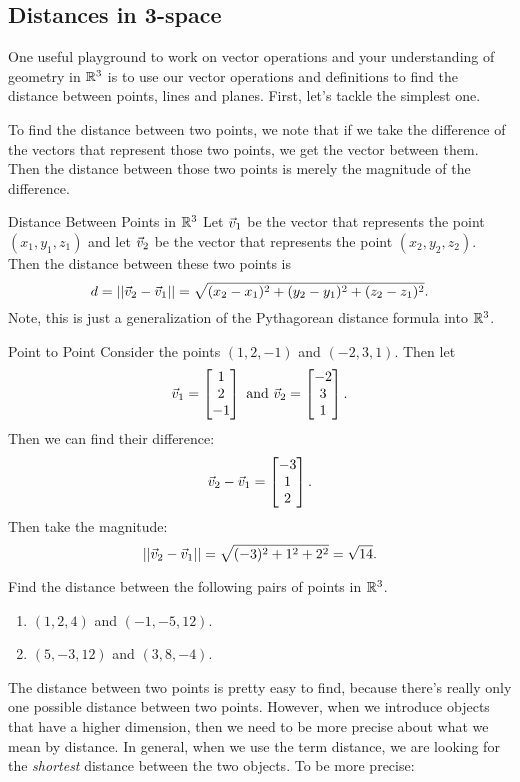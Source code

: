 \subsection{Distances in 3-space}
One useful playground to work on vector operations and your understanding of geometry in $\mathbb{R}^3$ is to use our vector operations and definitions to find the distance between points, lines and planes. First, let's tackle the simplest one.

To find the distance between two points, we note that if we take the difference of the vectors that represent those two points, we get the vector between them. Then the distance between those two points is merely the magnitude of the difference.

\begin{definition}{Distance Between Points in $\mathbb{R}^3$}
Let $\vec{v}_1$ be the vector that represents the point $(x_1,y_1,z_1)$ and let $\vec{v}_2$ be the vector that represents the point $(x_2,y_2,z_2)$. Then the distance between these two points is $$d=||\vec{v}_2-\vec{v}_1||=\sqrt{(x_2-x_1)^2+(y_2-y_1)^2+(z_2-z_1)^2}. $$
Note, this is just a generalization of the Pythagorean distance formula into $\mathbb{R}^3$.
\end{definition}

\begin{example}{Point to Point}
Consider the points $(1,2,-1)$ and $(-2,3,1)$. Then let
$$\vec{v}_1=\begin{bmatrix}1\\2\\-1\end{bmatrix}\text{ and }\vec{v}_2=\begin{bmatrix}-2\\3\\1\end{bmatrix} .$$
Then we can find their difference:
$$\vec{v}_2-\vec{v}_1=\begin{bmatrix}-3\\1\\2\end{bmatrix}. $$ Then take the magnitude: $$||\vec{v}_2-\vec{v}_1||=\sqrt{(-3)^2+1^2+2^2}=\sqrt{14}.$$
\end{example}

\begin{exercise}{}
Find the distance between the following pairs of points in $\mathbb{R}^3$.
\begin{enumerate}
\item $(1,2,4)$ and $(-1,-5,12)$.
\vspace{1em}
\item $(5,-3,12)$ and $(3,8,-4)$.
\end{enumerate}
\end{exercise}

The distance between two points is pretty easy to find, because there's really only one possible distance between two points. However, when we introduce objects that have a higher dimension, then we need to be more precise about what we mean by distance. In general, when we use the term distance, we are looking for the \textit{shortest} distance between the two objects. To be more precise:

